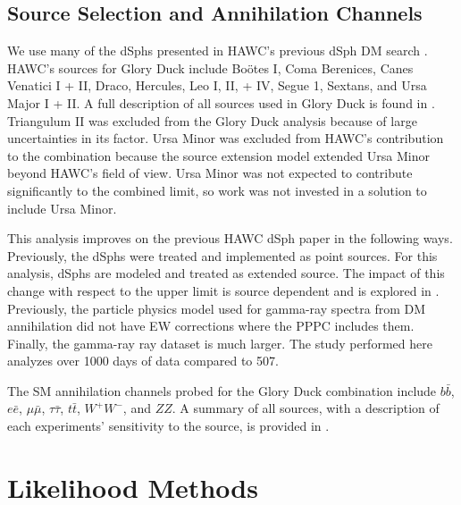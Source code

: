 \subsection{Source Selection and Annihilation Channels}\label{sec:gd_srcs_y_chan}

We use many of the dSphs presented in HAWC's previous dSph DM search \cite{Albert_2018}.
HAWC's sources for Glory Duck include Boötes I, Coma Berenices, Canes Venatici I + II, Draco, Hercules, Leo I, II, + IV, Segue 1, Sextans, and Ursa Major I + II.
A full description of all sources used in Glory Duck is found in .
Triangulum II was excluded from the Glory Duck analysis because of large uncertainties in its \J factor.
Ursa Minor was excluded from HAWC's contribution to the combination because the source extension model extended Ursa Minor beyond HAWC's field of view.
Ursa Minor was not expected to contribute significantly to the combined limit, so work was not invested in a solution to include Ursa Minor.

This analysis improves on the previous HAWC dSph paper \cite{Albert_2018} in the following ways.
Previously, the dSphs were treated and implemented as point sources.
For this analysis, dSphs are modeled and treated as extended source.
The impact of this change with respect to the upper limit is source dependent and is explored in .
Previously, the particle physics model used for gamma-ray spectra from DM annihilation did not have EW corrections where the PPPC includes them.
Finally, the gamma-ray ray dataset is much larger.
The study performed here analyzes over 1000 days of data compared to 507.

The SM annihilation channels probed for the Glory Duck combination include $b\bar{b}$, $e\bar{e}$, $\mu\bar{\mu}$, $\tau\bar{\tau}$, $t\bar{t}$, $W^+W^-$, and $ZZ$.
A summary of all sources, with a description of each experiments' sensitivity to the source, is provided in .




\section{Likelihood Methods} \label{sec:gd_ll_methods}

